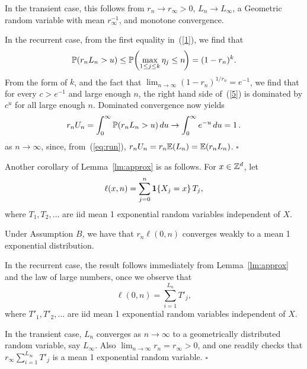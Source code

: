 In the transient case, this follows from $r_n\to r_\infty>0$, $L_n\to L_\infty$, a Geometric random variable with mean $r_\infty^{-1}$, 
and monotone convergence.

In the recurrent case, from the first equality in~(\ref{1}), we find that
\begin{equation} \label{6}
\P(r_n L_n>u)\leq\P\!\left(\max_{1\leq j\leq k}\eta_j\leq n\!\right)=(1-r_n)^k.
\end{equation} 
From the form of $k$, and the fact that $\lim_{n\to\infty}(1-r_n)^{1/r_n}=e^{-1}$, we find that for every $c>e^{-1}$ and large enough $n$, the right
hand side of~(\ref{5}) is dominated by $c^u$ for all large enough $n$. Dominated convergence now yields
\begin{equation} \label{7}
r_n U_n=\int_0^\infty\P(r_n L_n>u)\,du\to\int_0^\infty e^{-u}\,du=1\,.
\end{equation} 
as $n\to\infty$, since, from~(\ref{eq:run}), $r_n U_n=r_n{\mathbb E}(L_n)= {\mathbb E}(r_nL_n)$. $\square$

\bigskip


Another corollary of Lemma~\ref{lm:approx} is as follows. For $x\in{\mathbb Z}^d$, let
\begin{equation} \label{71}
\ell(x,n)=\sum_{j=0}^n \1\{X_j=x\}\,T_j,
\end{equation}
where $T_1,T_2,\ldots$ are iid mean 1 exponential random variables independent of $X$.

\begin{cor}
\label{cor:approx1}
Under Assumption $B$, we have that $r_n\ell(0,n)$ converges weakly to a mean 1 exponential distribution.
\end{cor}


In the recurrent case, the result follows immediately from Lemma~\ref{lm:approx} and the law of large numbers, 
once we observe that 
\begin{equation} \label{8}
\ell(0,n)=\sum_{i=1}^{L_n} T'_j ,
\end{equation} 
where $T'_1,T'_2,\ldots$ are iid mean 1 exponential random variables independent of $X$.  

In the transient case, $L_n$ converges as $n\to\infty$ to a geometrically distributed random variable, say $L_\infty$. 
Also $\lim_{n\to\infty}r_n=r_\infty>0$, and one readily checks that $r_\infty\sum_{i=1}^{L_\infty} T'_j$ is a mean 1 exponential 
random variable. 
$\square$

